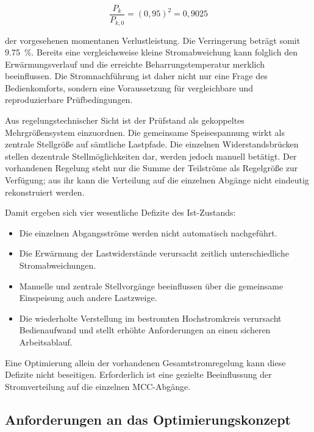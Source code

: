 \begin{equation}
    \frac{P_k}{P_{k,0}}
    =
    (0{,}95)^2
    =
    0{,}9025
    \label{eq:ist_leistungsabweichung_beispiel}
\end{equation}

der vorgesehenen momentanen Verlustleistung. Die Verringerung beträgt somit
\SI{9.75}{\percent}. Bereits eine vergleichsweise kleine Stromabweichung kann
folglich den Erwärmungsverlauf und die erreichte Beharrungstemperatur
merklich beeinflussen. Die Stromnachführung ist daher nicht nur eine Frage
des Bedienkomforts, sondern eine Voraussetzung für vergleichbare und
reproduzierbare Prüfbedingungen.

Aus regelungstechnischer Sicht ist der Prüfstand als gekoppeltes
Mehrgrößensystem einzuordnen. Die gemeinsame Speisespannung wirkt als
zentrale Stellgröße auf sämtliche Lastpfade. Die einzelnen
Widerstandsbrücken stellen dezentrale Stellmöglichkeiten dar, werden jedoch
manuell betätigt. Der vorhandenen Regelung steht nur die Summe der
Teilströme als Regelgröße zur Verfügung; aus ihr kann die Verteilung auf die
einzelnen Abgänge nicht eindeutig rekonstruiert werden.

Damit ergeben sich vier wesentliche Defizite des Ist-Zustands:

\begin{itemize}
    \item Die einzelnen Abgangsströme werden nicht automatisch nachgeführt.
    \item Die Erwärmung der Lastwiderstände verursacht zeitlich
    unterschiedliche Stromabweichungen.
    \item Manuelle und zentrale Stellvorgänge beeinflussen über die
    gemeinsame Einspeisung auch andere Lastzweige.
    \item Die wiederholte Verstellung im bestromten Hochstromkreis verursacht
    Bedienaufwand und stellt erhöhte Anforderungen an einen sicheren
    Arbeitsablauf.
\end{itemize}

Eine Optimierung allein der vorhandenen Gesamtstromregelung kann diese
Defizite nicht beseitigen. Erforderlich ist eine gezielte Beeinflussung der
Stromverteilung auf die einzelnen MCC-Abgänge.


\subsection{Anforderungen an das Optimierungskonzept}
\label{sec:anforderungen_optimierung}

